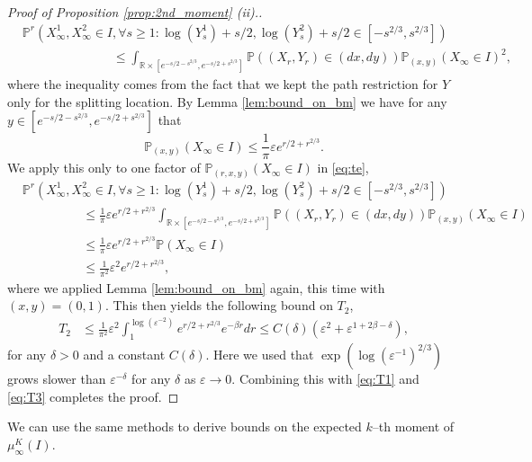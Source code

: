 \documentclass{article}
\theoremstyle{definition}
\numberwithin{equation}{section}
\numberwithin{thm}{section}
\newcommand*{\eps}{\ensuremath{\varepsilon}}            %
\newcommand*{\RR}{\ensuremath{\mathbb{R}}}	        	%
\newcommand*{\PP}{\ensuremath{\mathbb{P}}}	        	%
\begin{document}
\begin{proof}[Proof of Proposition \ref{prop:2nd_moment} (ii).]
    \begin{align}
        &\PP^r\left(X^1_\infty,X_\infty^2\in I,\forall s\geq 1: \log(Y_s^1)+s/2, \log(Y_s^2)+s/2 \in [-s^{2/3},s^{2/3}]\right) \nonumber\\ 
        &\hspace{3cm}\leq \int_{\RR\times [e^{-s/2-s^{2/3}},e^{-s/2+s^{2/3}}]} \PP((X_r,Y_r)\in(dx,dy))\PP_{(x,y)}(X_\infty \in I)^2 , \label{eq:te}
    \end{align}
    where the inequality comes from the fact that {we} kept the path restriction for $Y$ only for the splitting location. By Lemma \ref{lem:bound_on_bm} we have for any $y\in [e^{-s/2-s^{2/3}},e^{-s/2+s^{2/3}}]$ that
    \begin{equation*}
        \PP_{(x,y)}(X_\infty \in I) \leq \frac{1}{\pi}\eps e^{r/2+r^{2/3}}.
    \end{equation*}
    We apply this only to one factor of $\PP_{(r,x,y)}(X_\infty \in I)$ in \eqref{eq:te},
    \begin{align*}
        &\PP^r\left(X^1_\infty,X_\infty^2\in I,\forall s\geq 1: \log(Y_s^1)+s/2, \log(Y_s^2)+s/2 \in [-s^{2/3},s^{2/3}]\right) \nonumber\\ 
        &\hspace{2cm}\leq \frac{1}{\pi}\eps e^{r/2+r^{2/3}}\int_{\RR\times [e^{-s/2-s^{2/3}},e^{-s/2+s^{2/3}}]} \PP((X_r,Y_r)\in(dx,dy))\PP_{(x,y)}(X_\infty \in I) \\
        &\hspace{2cm}\leq \frac{1}{\pi}\eps e^{r/2+r^{2/3}}\PP(X_\infty \in I) \\
        &\hspace{2cm}\leq \frac{1}{\pi^2}\eps^2 e^{r/2+r^{2/3}},
    \end{align*}
    where we applied Lemma \ref{lem:bound_on_bm} again, this time with $(x,y)=(0,1)$. This then yields the following bound on $T_2$,
    \begin{align*}
        T_2 &\leq  \frac{1}{\pi^2}\eps^2\int_1^{\log(\eps^{-2})}e^{r/2+r^{2/3}} e^{-\beta r} dr \leq C(\delta)\left(\eps^2 + \eps^{1+2\beta-\delta} \right),
    \end{align*}
    for any $\delta>0$ and a constant $C(\delta)$. Here we used that $\exp(\log(\eps^{-1})^{2/3})$ grows slower than $\eps^{-\delta}$ for any $\delta$ as $\eps\to0$. Combining this with \eqref{eq:T1} and \eqref{eq:T3} completes the proof. 
\end{proof}

We can use the same methods to derive bounds on the expected $k$--th moment of $\mu_\infty^K(I)$. 
\end{document}
